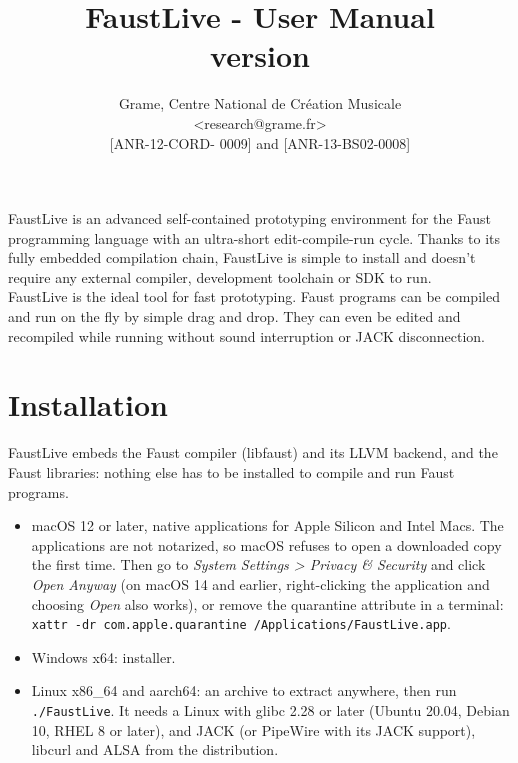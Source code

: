 \documentclass[a4paper]{article}
\begin{document}
\newcommand{\flversion}{\unskip}

\title{FaustLive - User Manual \\ version \flversion}

\author{Grame, Centre National de Création Musicale\\
{\small <research@grame.fr>} \\
\vspace{2mm}
[ANR-12-CORD- 0009] and [ANR-13-BS02-0008]
}

\maketitle


\vspace{\fill}

FaustLive is an advanced self-contained prototyping environment for the Faust programming language with an ultra-short edit-compile-run cycle. Thanks to its fully embedded compilation chain, FaustLive is simple to install and doesn't require any external compiler, development toolchain or SDK to run. \\

FaustLive is the ideal tool for fast prototyping. Faust programs can be compiled and run on the fly by simple drag and drop. They can even be edited and recompiled while running without sound interruption or JACK disconnection.
\vspace{\fill}
\newpage
\tableofcontents

\newpage
\section{Installation}

FaustLive embeds the Faust compiler (libfaust) and its LLVM backend, and the Faust libraries: nothing else has to be installed to compile and run Faust programs.

\begin{itemize}
\item macOS 12 or later, native applications for Apple Silicon and Intel Macs. The applications are not notarized, so macOS refuses to open a downloaded copy the first time. Then go to \textit{System Settings > Privacy \& Security} and click \textit{Open Anyway} (on macOS 14 and earlier, right-clicking the application and choosing \textit{Open} also works), or remove the quarantine attribute in a terminal: \texttt{xattr -dr com.apple.quarantine /Applications/FaustLive.app}.
\item Windows x64: installer.
\item Linux x86\_64 and aarch64: an archive to extract anywhere, then run \texttt{./FaustLive}. It needs a Linux with glibc 2.28 or later (Ubuntu 20.04, Debian 10, RHEL 8 or later), and JACK (or PipeWire with its JACK support), libcurl and ALSA from the distribution.
\end{itemize}
\end{document}
